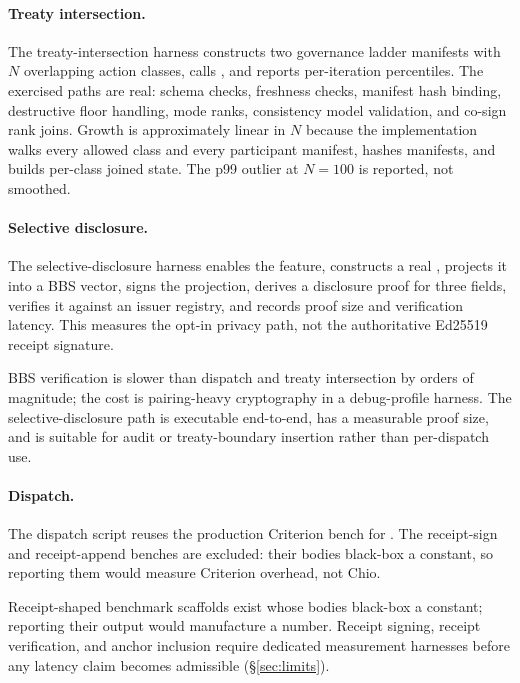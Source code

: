 \paragraph{Treaty intersection.}
The treaty-intersection harness constructs two governance ladder manifests with $N$ overlapping action classes, calls , and reports per-iteration percentiles. The exercised paths are real: schema checks, freshness checks, manifest hash binding, destructive floor handling, mode ranks, consistency model validation, and co-sign rank joins. Growth is approximately linear in $N$ because the implementation walks every allowed class and every participant manifest, hashes manifests, and builds per-class joined state. The p99 outlier at $N{=}100$ is reported, not smoothed.

\paragraph{Selective disclosure.}
The selective-disclosure harness enables the  feature, constructs a real , projects it into a BBS vector, signs the projection, derives a disclosure proof for three fields, verifies it against an issuer registry, and records proof size and verification latency. This measures the opt-in privacy path, not the authoritative Ed25519 receipt signature.

BBS verification is slower than dispatch and treaty intersection by orders of magnitude; the cost is pairing-heavy cryptography in a debug-profile harness. The selective-disclosure path is executable end-to-end, has a measurable proof size, and is suitable for audit or treaty-boundary insertion rather than per-dispatch use.

\paragraph{Dispatch.}
The dispatch script reuses the production Criterion bench for . The receipt-sign and receipt-append benches are excluded: their bodies black-box a constant, so reporting them would measure Criterion overhead, not Chio.

Receipt-shaped benchmark scaffolds exist whose bodies black-box a constant; reporting their output would manufacture a number. Receipt signing, receipt verification, and anchor inclusion require dedicated measurement harnesses before any latency claim becomes admissible (\S\ref{sec:limits}).

